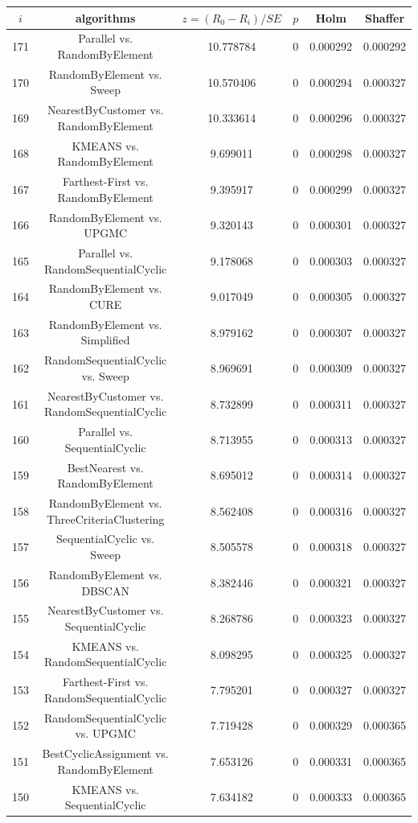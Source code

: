 \documentclass[a4paper,10pt]{article}
\begin{document}
\begin{landscape}
\begin{table}[!htp]
\centering\scriptsize
\begin{tabular}{cccccc}
$i$&algorithms&$z=(R_0 - R_i)/SE$&$p$&Holm&Shaffer\\
\hline171&Parallel vs. RandomByElement&10.778784&0&0.000292&0.000292\\
170&RandomByElement vs. Sweep&10.570406&0&0.000294&0.000327\\
169&NearestByCustomer vs. RandomByElement&10.333614&0&0.000296&0.000327\\
168&KMEANS vs. RandomByElement&9.699011&0&0.000298&0.000327\\
167&Farthest-First vs. RandomByElement&9.395917&0&0.000299&0.000327\\
166&RandomByElement vs. UPGMC&9.320143&0&0.000301&0.000327\\
165&Parallel vs. RandomSequentialCyclic&9.178068&0&0.000303&0.000327\\
164&RandomByElement vs. CURE&9.017049&0&0.000305&0.000327\\
163&RandomByElement vs. Simplified&8.979162&0&0.000307&0.000327\\
162&RandomSequentialCyclic vs. Sweep&8.969691&0&0.000309&0.000327\\
161&NearestByCustomer vs. RandomSequentialCyclic&8.732899&0&0.000311&0.000327\\
160&Parallel vs. SequentialCyclic&8.713955&0&0.000313&0.000327\\
159&BestNearest vs. RandomByElement&8.695012&0&0.000314&0.000327\\
158&RandomByElement vs. ThreeCriteriaClustering&8.562408&0&0.000316&0.000327\\
157&SequentialCyclic vs. Sweep&8.505578&0&0.000318&0.000327\\
156&RandomByElement vs. DBSCAN&8.382446&0&0.000321&0.000327\\
155&NearestByCustomer vs. SequentialCyclic&8.268786&0&0.000323&0.000327\\
154&KMEANS vs. RandomSequentialCyclic&8.098295&0&0.000325&0.000327\\
153&Farthest-First vs. RandomSequentialCyclic&7.795201&0&0.000327&0.000327\\
152&RandomSequentialCyclic vs. UPGMC&7.719428&0&0.000329&0.000365\\
151&BestCyclicAssignment vs. RandomByElement&7.653126&0&0.000331&0.000365\\
150&KMEANS vs. SequentialCyclic&7.634182&0&0.000333&0.000365\\

\end{tabular}
\end{table}
\end{landscape}
\end{document}
